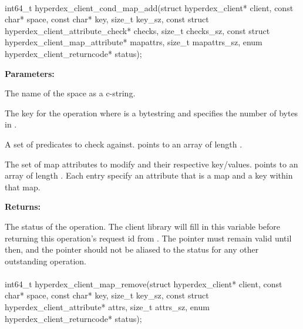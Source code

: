 \paragraph{}
\label{api:c:cond_map_add}
\begin{ccode}
int64_t hyperdex_client_cond_map_add(struct hyperdex_client* client,
                const char* space,
                const char* key, size_t key_sz,
                const struct hyperdex_client_attribute_check* checks, size_t checks_sz,
                const struct hyperdex_client_map_attribute* mapattrs, size_t mapattrs_sz,
                enum hyperdex_client_returncode* status);
\end{ccode}
\funcdesc 

\noindent\textbf{Parameters:}
\begin{description}[labelindent=\widthof{{\code{mapattrs}, \code{mapattrs\_sz}}},leftmargin=*,noitemsep,nolistsep,align=right]
\item[\code{space}] The name of the space as a c-string.
\item[\code{key}, \code{key\_sz}] The key for the operation where  is a bytestring and  specifies the number of bytes in .
\item[\code{checks}, \code{checks\_sz}] A set of predicates to check against.   points to an array of length .
\item[\code{mapattrs}, \code{mapattrs\_sz}] The set of map attributes to modify and their respective key/values.   points to an array of length .  Each entry specify an attribute that is a map and a key within that map.
\end{description}

\noindent\textbf{Returns:}
\begin{description}[labelindent=\widthof{{\code{status}}},leftmargin=*,noitemsep,nolistsep,align=right]
\item[\code{status}] The status of the operation.  The client library will fill in this variable before returning this operation's request id from .  The pointer must remain valid until then, and the pointer should not be aliased to the status for any other outstanding operation.
\end{description}

\paragraph{}
\label{api:c:map_remove}
\begin{ccode}
int64_t hyperdex_client_map_remove(struct hyperdex_client* client,
                const char* space,
                const char* key, size_t key_sz,
                const struct hyperdex_client_attribute* attrs, size_t attrs_sz,
                enum hyperdex_client_returncode* status);
\end{ccode}
\funcdesc 

